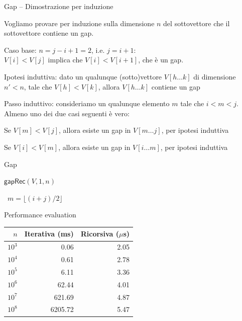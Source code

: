 \begin{frame}{Gap -- Dimostrazione per induzione}

Vogliamo provare per induzione sulla dimensione $n$ del sottovettore che 
il sottovettore contiene un gap.
\BIL
\item \alert{Caso base}: $n=j-i+1=2$, i.e. $j = i+1$: \\
$V[i]<V[j]$ implica che $V[i] < V[i+1]$, che è un gap.
\item \alert{Ipotesi induttiva}: dato un qualunque (sotto)vettore $V[h \ldots k]$ di 
dimensione $n'<n$, tale che $V[h] < V[k]$, allora $V[h \ldots k]$ contiene un gap
\item \alert{Passo induttivo}: consideriamo un qualunque elemento
$m$ tale che $i<m<j$. Almeno uno dei due casi seguenti è vero:
\BI
\item Se $V[m] < V[j]$, allora esiste un gap in $V[m \ldots j]$, per ipotesi
induttiva
\item Se $V[i] < V[m]$, allora esiste un gap in $V[i \ldots m]$, per ipotesi
induttiva
\EI
\EIL

\end{frame}

\begin{frame}{Gap}

\vspace{-9pt}
\begin{Procedure}
\caption[A]{\INTEGER\ \textsf{gap}($\INTEGER[\,]\ V$, \INTEGER $n$)}
  \Return $\textsf{gapRec}(V, 1, n)$\;
\end{Procedure}

\begin{Procedure}
\caption[A]{\INTEGER\ \textsf{gapRec}($\INTEGER[\,]\ V$, \INTEGER $i$, \INTEGER $j$)}
\INTEGER\ $m = \lfloor (i+j)/2 \rfloor$\;

\end{Procedure}


\end{frame}

\begin{frame}{Performance evaluation}

\vspace{-9pt}
\begin{center}
\begin{tabular}{|r|r|r|}
\hline
$n$ & \textbf{Iterativa (ms)} & \textbf{Ricorsiva (${\mu}$s)}\\\hline
$10^3$ & 0.06 & 2.05\\\hline
$10^4$ & 0.61 & 2.78\\\hline
$10^5$ & 6.11 & 3.36\\\hline
$10^6$ & 62.44 & 4.01\\\hline
$10^7$ & 621.69 & 4.87\\\hline
$10^8$ & 6205.72 & 5.47\\\hline
\end{tabular}
\end{center}

\end{frame}








\begin{frame}{}

\end{frame}
